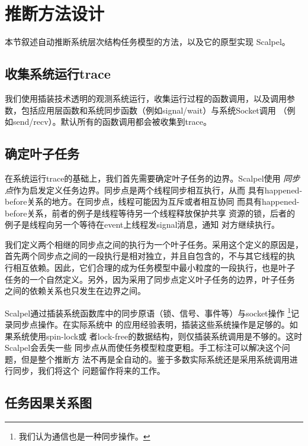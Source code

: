 \section{推断方法设计}
\label{sec:scp:design}

本节叙述自动推断系统层次结构任务模型的方法，以及它的原型实现
\pozhehao{}Scalpel。


\subsection{收集系统运行trace}

我们使用插装技术透明的观测系统运行，收集运行过程的函数调用，以及调用参
数，包括应用层函数和系统同步函数（例如signal/wait）与系统Socket调用
（例如send/recv）。默认所有的函数调用都会被收集到trace。


\subsection{确定叶子任务}

在系统运行trace的基础上，我们首先需要确定叶子任务的边界。Scalpel使用
\emph{同步点}作为启发定义任务边界。同步点是两个线程同步相互执行，从而
具有happened-before关系的地方。在同步点，线程可能因为互斥或者相互协同
而具有happened-before关系，前者的例子是线程等待另一个线程释放保护共享
资源的锁，后者的例子是线程向另一个等待在event上线程发signal消息，通知
对方继续执行。

我们定义两个相继的同步点之间的执行为一个叶子任务。采用这个定义的原因是，
首先两个同步点之间的一段执行是相对独立，并且自包含的，不与其它线程的执
行相互依赖。因此，它们合理的成为任务模型中最小粒度的一段执行，也是叶子
任务的一个自然定义。另外，因为采用了同步点定义叶子任务的边界，叶子任务
之间的依赖关系也只发生在边界之间。

Scalpel通过插装系统函数库中的同步原语（锁、信号、事件等）与socket操作
\footnote{我们认为通信也是一种同步操作。}记录同步点操作。在实际系统中
的应用经验表明，插装这些系统操作是足够的。如果系统使用spin-lock或
者lock-free的数据结构，则仅插装系统调用是不够的。这时Scalpel会丢失一些
同步点从而使任务模型粒度更粗。手工标注可以解决这个问题，但是整个推断方
法不再是全自动的。鉴于多数实际系统还是采用系统调用进行同步，我们将这个
问题留作将来的工作。

\subsection{任务因果关系图}

